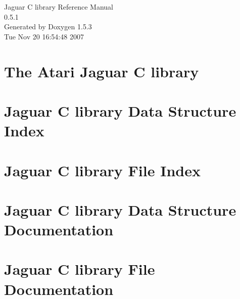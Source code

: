 \documentclass[a4paper]{book}
\begin{document}
\begin{titlepage}
\vspace*{7cm}
\begin{center}
{\Large Jaguar C library Reference Manual\\[1ex]\large 0.5.1 }\\
\vspace*{1cm}
{\large Generated by Doxygen 1.5.3}\\
\vspace*{0.5cm}
{\small Tue Nov 20 16:54:48 2007}\\
\end{center}
\end{titlepage}
\clearemptydoublepage
{}
\tableofcontents
\clearemptydoublepage
{}
\chapter{The Atari Jaguar C library }
\label{index}\hypertarget{index}{}
\chapter{Jaguar C library Data Structure Index}

\chapter{Jaguar C library File Index}

\chapter{Jaguar C library Data Structure Documentation}


\chapter{Jaguar C library File Documentation}






\printindex
\end{document}
